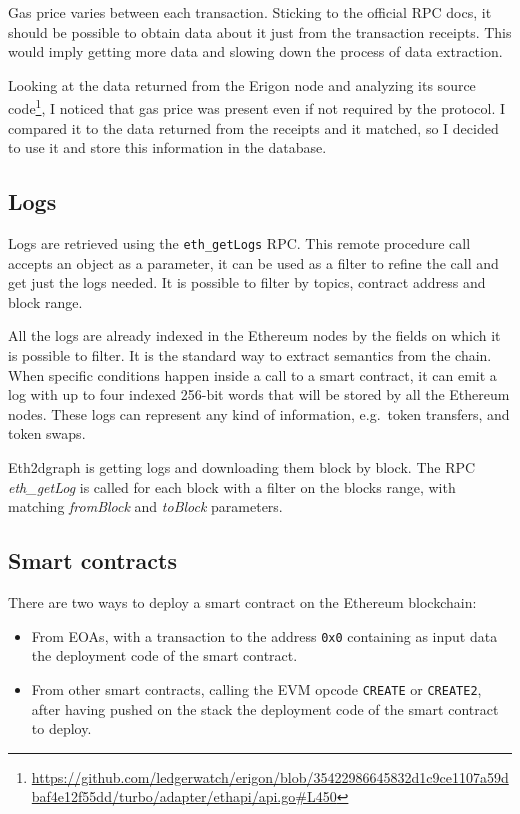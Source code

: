 Gas price varies between each transaction. Sticking to the official RPC docs, it should be possible to obtain data about it just from the transaction receipts. This would imply getting more data and slowing down the process of data extraction.

Looking at the data returned from the Erigon node and analyzing its source code\footnote{\url{https://github.com/ledgerwatch/erigon/blob/35422986645832d1c9ce1107a59dbaf4e12f55dd/turbo/adapter/ethapi/api.go\#L450}}, I noticed that gas price was present even if not required by the protocol. I compared it to the data returned from the receipts and it matched, so I decided to use it and store this information in the database.

\subsection{Logs}

Logs are retrieved using the \texttt{eth\_getLogs} RPC. This remote procedure call accepts an object as a parameter, it can be used as a filter to refine the call and get just the logs needed. It is possible to filter by topics, contract address and block range. 

All the logs are already indexed in the Ethereum nodes by the fields on which it is possible to filter. It is the standard way to extract semantics from the chain. When specific conditions happen inside a call to a smart contract, it can emit a log with up to four indexed 256-bit words that will be stored by all the Ethereum nodes. These logs can represent any kind of information, e.g.~token transfers, and token swaps.

Eth2dgraph is getting logs and downloading them block by block. The RPC \textit{eth\_getLog} is called for each block with a filter on the blocks range, with matching \textit{fromBlock} and \textit{toBlock} parameters.

\subsection{Smart contracts}

There are two ways to deploy a smart contract on the Ethereum blockchain: 

\begin{itemize}
    \item From EOAs, with a transaction to the address \texttt{0x0} containing as input data the deployment code of the smart contract.
    \item From other smart contracts, calling the EVM opcode \texttt{CREATE} or \texttt{CREATE2}, after having pushed on the stack the deployment code of the smart contract to deploy.
\end{itemize}

